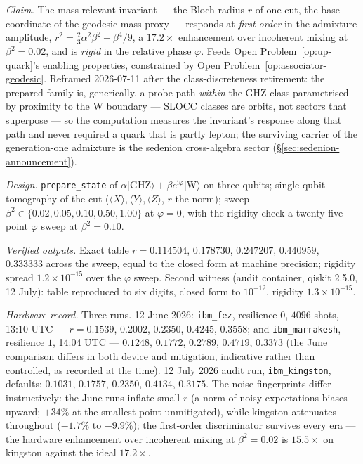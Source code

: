 \emph{Claim.} The mass-relevant invariant --- the Bloch radius $r$ of one cut, the base
coordinate of the geodesic mass proxy --- responds at \emph{first order} in the admixture
amplitude, $r^{2} = \tfrac23\alpha^{2}\beta^{2} + \beta^{4}/9$, a $17.2\times$ enhancement over
incoherent mixing at $\beta^{2} = 0.02$, and is \emph{rigid} in the relative phase $\varphi$.
Feeds Open Problem~\ref{op:up-quark}'s enabling properties, constrained by Open
Problem~\ref{op:associator-geodesic}. Reframed 2026-07-11 after the class-discreteness
retirement: the prepared family is, generically, a probe path \emph{within} the GHZ class
parametrised by proximity to the W boundary --- SLOCC classes are orbits, not sectors that
superpose --- so the computation measures the invariant's response along that path and never
required a quark that is partly lepton; the surviving carrier of the generation-one admixture is
the sedenion cross-algebra sector (\S\ref{sec:sedenion-announcement}).

\emph{Design.} \texttt{prepare\_state} of
$\alpha\lvert\mathrm{GHZ}\rangle + \beta e^{\mathrm{i}\varphi}\lvert\mathrm{W}\rangle$ on three
qubits; single-qubit tomography of the cut ($\langle X\rangle, \langle Y\rangle,
\langle Z\rangle$, $r$ the norm); sweep $\beta^{2} \in \{0.02, 0.05, 0.10, 0.50, 1.00\}$ at
$\varphi = 0$, with the rigidity check a twenty-five-point $\varphi$ sweep at
$\beta^{2} = 0.10$.

\emph{Verified outputs.} Exact table $r = 0.114504$, $0.178730$, $0.247207$, $0.440959$,
$0.333333$ across the sweep, equal to the closed form at machine precision; rigidity spread
$1.2\times10^{-15}$ over the $\varphi$ sweep. Second witness (audit container, qiskit 2.5.0,
12 July): table reproduced to six digits, closed form to $10^{-12}$, rigidity
$1.3\times10^{-15}$.

\emph{Hardware record.} Three runs. 12 June 2026: \texttt{ibm\_fez}, resilience $0$, $4096$
shots, 13:10 UTC --- $r = 0.1539$, $0.2002$, $0.2350$, $0.4245$, $0.3558$; and
\texttt{ibm\_marrakesh}, resilience $1$, 14:04 UTC --- $0.1248$, $0.1772$, $0.2789$, $0.4719$,
$0.3373$ (the June comparison differs in both device and mitigation, indicative rather than
controlled, as recorded at the time). 12 July 2026 audit run, \texttt{ibm\_kingston}, defaults:
$0.1031$, $0.1757$, $0.2350$, $0.4134$, $0.3175$. The noise fingerprints differ instructively:
the June runs inflate small $r$ (a norm of noisy expectations biases upward; $+34\%$ at the
smallest point unmitigated), while kingston attenuates throughout ($-1.7\%$ to $-9.9\%$); the
first-order discriminator survives every era --- the hardware enhancement over incoherent mixing
at $\beta^{2} = 0.02$ is $15.5\times$ on kingston against the ideal $17.2\times$.

